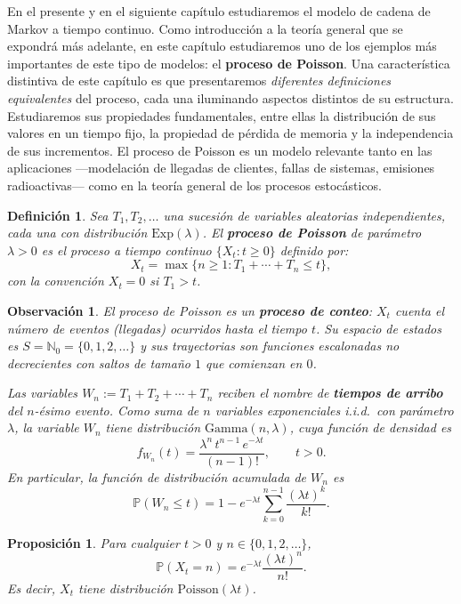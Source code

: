 \documentclass[12pt]{book}
\newtheorem{definition}{Definición}[chapter]
\newtheorem{proposition}{Proposición}[chapter]
\newtheorem{remark}{Observación}[chapter]
\begin{document}
En el presente y en el siguiente capítulo estudiaremos el modelo de cadena de Markov a tiempo continuo. Como introducción a la teoría general que se expondrá más adelante, en este capítulo estudiaremos uno de los ejemplos más importantes de este tipo de modelos: el \textbf{proceso de Poisson}. Una característica distintiva de este capítulo es que presentaremos \emph{diferentes definiciones equivalentes} del proceso, cada una iluminando aspectos distintos de su estructura. Estudiaremos sus propiedades fundamentales, entre ellas la distribución de sus valores en un tiempo fijo, la propiedad de pérdida de memoria y la independencia de sus incrementos. El proceso de Poisson es un modelo relevante tanto en las aplicaciones —modelación de llegadas de clientes, fallas de sistemas, emisiones radioactivas— como en la teoría general de los procesos estocásticos.

\begin{definition}
Sea $T_1, T_2, \ldots$ una sucesión de variables aleatorias independientes, cada una con distribución $\mathrm{Exp}(\lambda)$. El \textbf{proceso de Poisson} de parámetro $\lambda > 0$ es el proceso a tiempo continuo $\{X_t : t \ge 0\}$ definido por:
\[
    X_t = \max\bigl\{n \ge 1 : T_1 + \cdots + T_n \le t\bigr\},
\]
con la convención $X_t = 0$ si $T_1 > t$.
\end{definition}

\begin{remark}
El proceso de Poisson es un \textbf{proceso de conteo}: $X_t$ cuenta el número de eventos (llegadas) ocurridos hasta el tiempo $t$. Su espacio de estados es $S = \mathbb{N}_0 = \{0, 1, 2, \ldots\}$ y sus trayectorias son funciones escalonadas no decrecientes con saltos de tamaño $1$ que comienzan en $0$.

Las variables $W_n := T_1 + T_2 + \cdots + T_n$ reciben el nombre de \textbf{tiempos de arribo} del $n$-ésimo evento. Como suma de $n$ variables exponenciales i.i.d.\ con parámetro $\lambda$, la variable $W_n$ tiene distribución $\mathrm{Gamma}(n, \lambda)$, cuya función de densidad es
\[
    f_{W_n}(t) = \frac{\lambda^n\, t^{n-1}\, e^{-\lambda t}}{(n-1)!}, \qquad t > 0.
\]
En particular, la función de distribución acumulada de $W_n$ es
\[
    \mathbb{P}(W_n \le t) = 1 - e^{-\lambda t}\sum_{k=0}^{n-1}\frac{(\lambda t)^k}{k!}.
\]
\end{remark}

\begin{proposition}
Para cualquier $t > 0$ y $n \in \{0, 1, 2, \ldots\}$,
\[
    \mathbb{P}(X_t = n) = e^{-\lambda t}\frac{(\lambda t)^n}{n!}.
\]
Es decir, $X_t$ tiene distribución $\mathrm{Poisson}(\lambda t)$.
\end{proposition}
\end{document}
